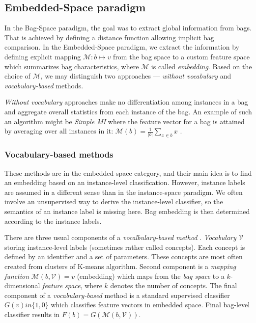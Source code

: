 \subsection{Embedded-Space paradigm}
In the Bag-Space paradigm, the goal was to extract global information from bags. That is achieved by defining a distance function allowing implicit bag comparison. In the Embedded-Space paradigm, we extract the information by defining explicit mapping $\mathcal{M}:b\mapsto v$ from the bag space to a custom feature space which summarizes bag characteristics,  where $\mathcal{M}$ is called \emph{embedding}. Based on the choice of $\mathcal{M}$, we may distinguish two approaches --- \emph{without vocabulary} and \emph{vocabulary-based} methods.

\emph{Without vocabulary} approaches make no differentiation among instances in a bag and aggregate overall statistics from each instance of the bag. An example of such an algorithm might be \emph{Simple MI} where the feature vector for a bag is attained by averaging over all instances in it: $\mathcal{M}(b)=\frac{1}{|b|}\sum_{x\in b}x$ \cite{Dong2006}.

\subsubsection{Vocabulary-based methods}
These methods are in the embedded-space category, and their main idea is to find an embedding based on an instance-level classification. However, instance labels are assumed in a different sense than in the instance-space paradigm. We often involve an unsupervised way to derive the instance-level classifier, so the semantics of an instance label is missing here. Bag embedding is then determined according to the instance labels.

There are three usual components of a \emph{vocalbulary-based method} \cite{Amores2013}. \emph{Vocabulary} $\mathcal{V}$ storing instance-level labels (sometimes rather called concepts). Each concept is defined by an identifier and a set of parameters. These concepts are most often created from clusters of K-means algorithm. Second component is a \emph{mapping function} $\mathcal{M}(b, \mathcal{V})=v$ (embedding) which maps from the \emph{bag space} to  a $k$-dimensional \emph{feature space}, where $k$ denotes the number of concepts. The final component of a \emph{vocabulary-based} method is a standard supervised classifier $G(v) in \{1,0\}$ which classifies feature vectors in embedded space. Final bag-level classifier results in $F(b)=G(\mathcal{M}(b,\mathcal{V}))$.

